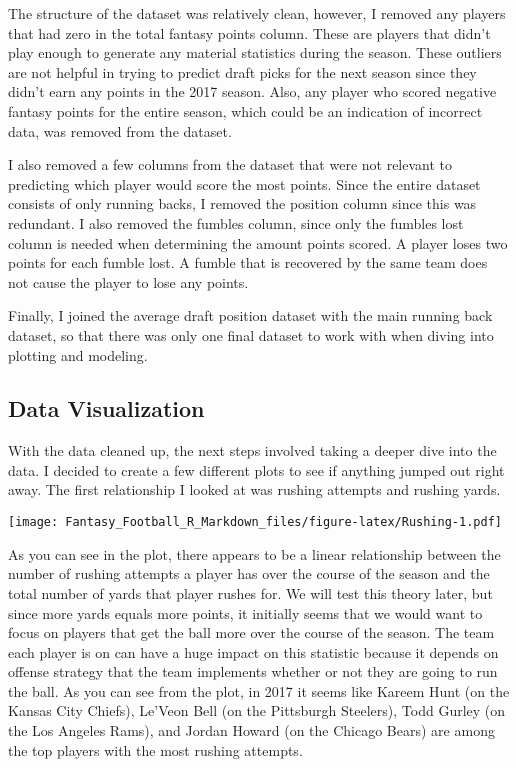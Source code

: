 \documentclass[]{article}
\begin{document}
The structure of the dataset was relatively clean, however, I removed
any players that had zero in the total fantasy points column. These are
players that didn't play enough to generate any material statistics
during the season. These outliers are not helpful in trying to predict
draft picks for the next season since they didn't earn any points in the
2017 season. Also, any player who scored negative fantasy points for the
entire season, which could be an indication of incorrect data, was
removed from the dataset.

I also removed a few columns from the dataset that were not relevant to
predicting which player would score the most points. Since the entire
dataset consists of only running backs, I removed the position column
since this was redundant. I also removed the fumbles column, since only
the fumbles lost column is needed when determining the amount points
scored. A player loses two points for each fumble lost. A fumble that is
recovered by the same team does not cause the player to lose any points.

Finally, I joined the average draft position dataset with the main
running back dataset, so that there was only one final dataset to work
with when diving into plotting and modeling.

\subsection{Data Visualization}\label{data-visualization}

With the data cleaned up, the next steps involved taking a deeper dive
into the data. I decided to create a few different plots to see if
anything jumped out right away. The first relationship I looked at was
rushing attempts and rushing yards.

\texttt{[image: Fantasy\_Football\_R\_Markdown\_files/figure-latex/Rushing-1.pdf]}

As you can see in the plot, there appears to be a linear relationship
between the number of rushing attempts a player has over the course of
the season and the total number of yards that player rushes for. We will
test this theory later, but since more yards equals more points, it
initially seems that we would want to focus on players that get the ball
more over the course of the season. The team each player is on can have
a huge impact on this statistic because it depends on offense strategy
that the team implements whether or not they are going to run the ball.
As you can see from the plot, in 2017 it seems like Kareem Hunt (on the
Kansas City Chiefs), Le'Veon Bell (on the Pittsburgh Steelers), Todd
Gurley (on the Los Angeles Rams), and Jordan Howard (on the Chicago
Bears) are among the top players with the most rushing attempts.
\end{document}
